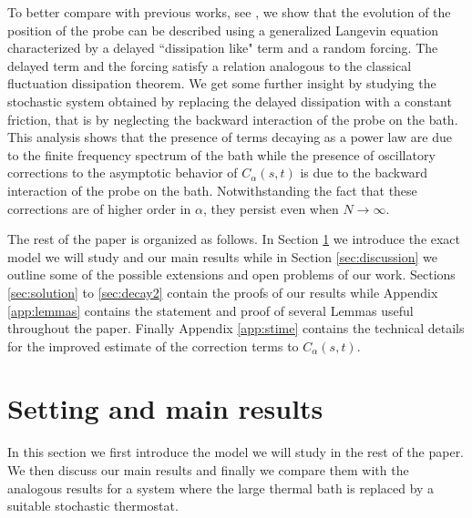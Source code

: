 \documentclass[11pt]{article}
\numberwithin{equation}{section}
\def\red{\textcolor{red}}
\def\red{}
\numberwithin{theorem}{section}
\begin{document}
\red{To better compare with previous works, see \cite{Mori65, Weiss}, we show that the evolution of the position of the
probe can be described using a generalized Langevin equation characterized by a delayed ``dissipation like" term and a
random forcing. The delayed term and the forcing satisfy a relation analogous to the classical fluctuation
dissipation theorem.} We get some further insight by studying the stochastic system obtained by replacing the delayed 
dissipation with a constant friction, that is by neglecting the backward interaction of the probe on
the bath. This analysis shows that the presence of terms decaying as a power law are due to the finite frequency 
spectrum of the bath 
while the presence of oscillatory corrections to the asymptotic behavior of
$C_\alpha(s,t)$ is due to the backward interaction of the probe on the bath. Notwithstanding the fact that these
corrections are of higher order in $\alpha$, they persist even when $N\to \infty$.

The rest of the paper is organized as follows. In Section \ref{sec:model} we introduce the exact model we will study and
our main results while in Section \ref{sec:discussion} we outline some of the possible extensions and open problems of
our work. Sections \ref{sec:solution} to \ref{sec:decay2} contain the proofs of our results while Appendix
\ref{app:lemmas} contains the statement and proof of several Lemmas useful throughout the paper. Finally Appendix
\ref{app:stime} contains the technical details for the improved estimate of the correction terms to $C_{\alpha}(s,t)$.
 
\section{Setting and main results} 
\label{sec:model}

In this section we first introduce the model we will study in the rest of the paper. We then discuss our main results
and finally we compare them with the analogous results for a system where the large thermal bath is replaced by a
suitable stochastic thermostat.
\end{document}
